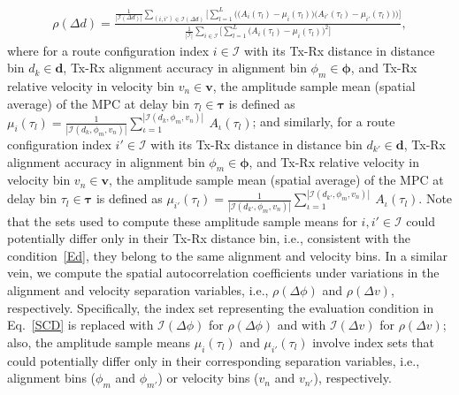 \documentclass[12pt, draftcls, onecolumn]{IEEEtran}
\begin{document}
{\begin{align}\label{SCD}
    \rho(\Delta d) = \frac{\frac{1}{|\mathcal{I}(\Delta d)|}\sum_{(i,i') \in \mathcal{I}(\Delta d)}\Bigg[\sum_{l = 1}^{L}\bigg(\Big(A_{i}(\tau_{l}) - \mu_{i}(\tau_{l})\Big)\Big(A_{i'}(\tau_{l}) - \mu_{i'}(\tau_{l})\Big)\bigg)\Bigg]}{\frac{1}{|\mathcal{I}|}\sum_{i \in \mathcal{I}}\bigg[\sum_{l = 1}^{L}\Big(A_{i}(\tau_{l}) - \mu_{i}(\tau_{l})\Big)^{2}\bigg]},
\end{align}
where for a route configuration index $i \in \mathcal{I}$ with its Tx-Rx distance in distance bin $d_{k} \in \mathbf{d}$, Tx-Rx alignment accuracy in alignment bin $\phi_{m} \in \boldsymbol{\phi}$, and Tx-Rx relative velocity in velocity bin $v_{n} \in \mathbf{v}$, the amplitude sample mean (spatial average) of the MPC at delay bin $\tau_{l} \in \boldsymbol{\tau}$ is defined as $\mu_{i}(\tau_{l}) = \frac{1}{|\mathcal{I}(d_{k}, \phi_{m}, v_{n})|}\sum_{\iota = 1}^{|\mathcal{I}(d_{k}, \phi_{m}, v_{n})|}\ A_{\iota}(\tau_{l})$; and similarly, for a route configuration index $i' \in \mathcal{I}$ with its Tx-Rx distance in distance bin $d_{k'} \in \mathbf{d}$, Tx-Rx alignment accuracy in alignment bin $\phi_{m} \in \boldsymbol{\phi}$, and Tx-Rx relative velocity in velocity bin $v_{n} \in \mathbf{v}$, the amplitude sample mean (spatial average) of the MPC at delay bin $\tau_{l} \in \boldsymbol{\tau}$ is defined as $\mu_{i'}(\tau_{l}) = \frac{1}{|\mathcal{I}(d_{k'}, \phi_{m}, v_{n})|}\sum_{\iota = 1}^{|\mathcal{I}(d_{k'}, \phi_{m}, v_{n})|}\ A_{\iota}(\tau_{l})$. Note that the sets used to compute these amplitude sample means for $i, i' \in \mathcal{I}$ could potentially differ only in their Tx-Rx distance bin, i.e., consistent with the condition~\eqref{Ed}, they belong to the same alignment and velocity bins. In a similar vein, we compute the spatial autocorrelation coefficients under variations in the alignment and velocity separation variables, i.e., $\rho(\Delta \phi)$ and $\rho(\Delta v)$, respectively. Specifically, the index set representing the evaluation condition in Eq.~\ref{SCD} is replaced with $\mathcal{I}(\Delta \phi)$ for $\rho(\Delta \phi)$ and with $\mathcal{I}(\Delta v)$ for $\rho(\Delta v)$; also, the amplitude sample means $\mu_{i}(\tau_{l})$ and $\mu_{i'}(\tau_{l})$ involve index sets that could potentially differ only in their corresponding separation variables, i.e., alignment bins ($\phi_{m}$ and $\phi_{m'}$) or velocity bins ($v_{n}$ and $v_{n'}$), respectively.\\
\begin{figure} [t]
     \centering

\end{figure}}
\end{document}
